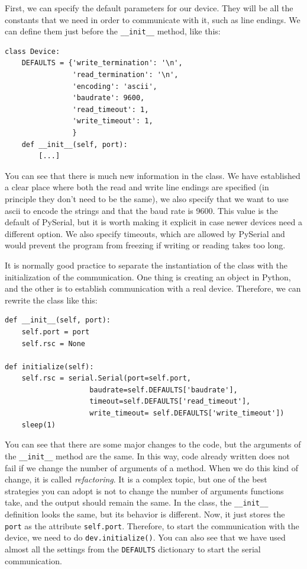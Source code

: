 First, we can specify the default parameters for our device. They will be all the constants that we need in order to communicate with it, such as line endings. We can define them just before the \texttt{__init__} method, like this:

\begin{verbatim}
class Device:
    DEFAULTS = {'write_termination': '\n',
                'read_termination': '\n',
                'encoding': 'ascii',
                'baudrate': 9600,
                'read_timeout': 1,
                'write_timeout': 1,
                }
    def __init__(self, port):
        [...]
\end{verbatim}

You can see that there is much new information in the class. We have established a clear place where both the read and write line endings are specified (in principle they don't need to be the same), we also specify that we want to use ascii to encode the strings and that the baud rate is 9600. This value is the default of PySerial, but it is worth making it explicit in case newer devices need a different option. We also specify timeouts, which are allowed by PySerial and would prevent the program from freezing if writing or reading takes too long.

It is normally good practice to separate the instantiation of the class with the initialization of the communication. One thing is creating an object in Python, and the other is to establish communication with a real device. Therefore, we can rewrite the class like this:

\begin{verbatim}
def __init__(self, port):
    self.port = port
    self.rsc = None

def initialize(self):
    self.rsc = serial.Serial(port=self.port,
                    baudrate=self.DEFAULTS['baudrate'],
                    timeout=self.DEFAULTS['read_timeout'],
                    write_timeout= self.DEFAULTS['write_timeout'])
    sleep(1)
\end{verbatim}

You can see that there are some major changes to the code, but the arguments of the \texttt{__init__} method are the same. In this way, code already written does not fail if we change the number of arguments of a method. When we do this kind of change, it is called \emph{refactoring}. It is a complex topic, but one of the best strategies you can adopt is not to change the number of arguments functions take, and the output should remain the same. In the class, the \texttt{__init__} definition looks the same, but its behavior is different. Now, it just stores the \texttt{port} as the attribute \texttt{self.port}. Therefore, to start the communication with the device, we need to do \texttt{dev.initialize()}. You can also see that we have used almost all the settings from the \texttt{DEFAULTS} dictionary to start the serial communication.

